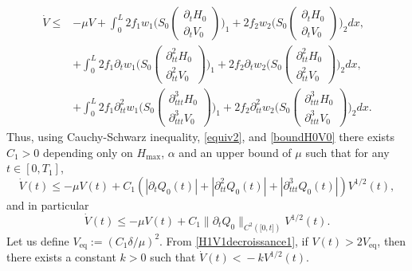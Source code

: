 \documentclass[JEP,XML,SOM,Unicode]{cedram}
\theoremstyle{definition}
\begin{document}
\begin{equation*}
\begin{split}
\dot V\leq& -\mu V
+ \int_{0}^{L}2f_{1}w_{1}\biggl(S_{0}\begin{pmatrix}\partial_{t}H_{0}\\ \partial_{t}V_{0}\end{pmatrix}\biggr)_{1}+2f_{2}w_{2}\biggl(S_{0}\begin{pmatrix}\partial_{t}H_{0}\\ \partial_{t}V_{0}\end{pmatrix}\biggr)_{2}dx,\\
&+ \int_{0}^{L}2f_{1}\partial_{t}w_{1}\biggl(S_{0}\begin{pmatrix}\partial_{tt}^{2}H_{0}\\ \partial_{tt}^{2}V_{0}\end{pmatrix}\biggr)_{1}+2f_{2}\partial_{t}w_{2}\biggl(S_{0}\begin{pmatrix}\partial_{tt}^{2}H_{0}\\ \partial_{tt}^{2}V_{0}\end{pmatrix}\biggr)_{2}dx,\\
&+ \int_{0}^{L}2f_{1}\partial_{tt}^{2}w_{1}\biggl(S_{0}\begin{pmatrix}\partial_{ttt}^{3}H_{0}\\ \partial_{ttt}^{3}V_{0}\end{pmatrix}\biggr)_{1}+2f_{2}\partial_{tt}^{2}w_{2}\biggl(S_{0}\begin{pmatrix}\partial_{ttt}^{3}H_{0}\\ \partial_{ttt}^{3}V_{0}\end{pmatrix}\biggr)_{2}dx.
\end{split}
\end{equation*}
Thus, using Cauchy-Schwarz inequality, \eqref{equiv2}, {and \eqref{boundH0V0}} there exists $C_{1}>0$
depending only on $H_{\max}$, $\alpha$ and an upper bound of $\mu$ such that for any $t\in[0,T_{1}]$,
\begin{equation}
\label{H1V1decroissance}
\dot V(t)\leq -\mu V(t)
+C_{1}\left(|\partial_{t}Q_{0}(t)|+|\partial_{tt}^{2}Q_{0}(t)|+|\partial_{ttt}^{3}Q_{0}(t)|\right)V^{1/2}(t),
\end{equation}
and in particular
\begin{equation}
\label{H1V1decroissance1}
\dot V(t)\leq -\mu V(t)
+C_{1}\lVert\partial_{t}Q_{0}\rVert_{C^{2}([0,{t]})}V^{1/2}(t).
\end{equation}
Let us define $V_\mathrm{eq}:=(C_{1}\delta/\mu)^{2}$. From \eqref{H1V1decroissance1}, if $V(t)>2V_\mathrm{eq}$, then there exists a constant $k\!>\!0$ such that $\dot V(t)\!<\!-k V^{1/2}(t)$.
\end{document}
